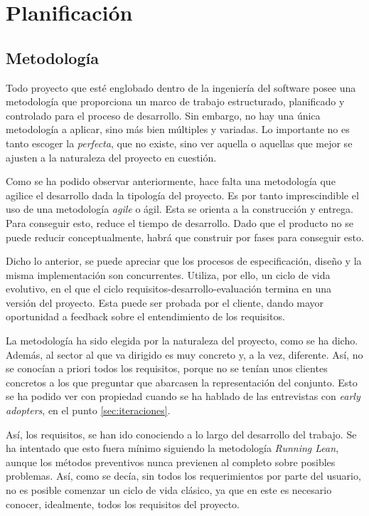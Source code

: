 
\chapter{Planificación}\label{planificacion}
\section{Metodología}\label{sec:metodologia_scrum}

Todo proyecto que esté englobado dentro de la ingeniería del software posee una metodología que proporciona un marco de trabajo estructurado, planificado y controlado para el proceso de desarrollo. Sin embargo, no hay una única metodología a aplicar, sino más bien múltiples y variadas. Lo importante no es tanto escoger la \textit{perfecta}, que no existe, sino ver aquella o aquellas que mejor se ajusten a la naturaleza del proyecto en cuestión. 

Como se ha podido observar anteriormente, hace falta una metodología que agilice el desarrollo dada la tipología del proyecto. Es por tanto imprescindible el uso de una metodología \textit{agile} o ágil. Esta se orienta a la construcción y entrega. Para conseguir esto, reduce el tiempo de desarrollo. Dado que el producto no se puede reducir conceptualmente, habrá que construir por fases para conseguir esto.

Dicho lo anterior, se puede apreciar que los procesos de especificación, diseño y la misma implementación son concurrentes. Utiliza, por ello, un ciclo de vida evolutivo, en el que el ciclo requisitos-desarrollo-evaluación termina en una versión del proyecto. Esta puede ser probada por el cliente, dando mayor oportunidad a feedback sobre el entendimiento de los requisitos.

La metodología ha sido elegida por la naturaleza del proyecto, como se ha dicho. Además, al sector al que va dirigido es muy concreto y, a la vez, diferente. Así, no se conocían a priori todos los requisitos, porque no se tenían unos clientes concretos a los que preguntar que abarcasen la representación del conjunto. Esto se ha podido ver con propiedad cuando se ha hablado de las entrevistas con \textit{early adopters}, en el punto \ref{sec:iteraciones}.

Así, los requisitos, se han ido conociendo a lo largo del desarrollo del trabajo. Se ha intentado que esto fuera mínimo siguiendo la metodología \textit{Running Lean}, aunque los métodos preventivos nunca previenen al completo sobre posibles problemas. Así, como se decía, sin todos los requerimientos por parte del usuario, no es posible comenzar un ciclo de vida clásico, ya que en este es necesario conocer, idealmente, todos los requisitos del proyecto.

